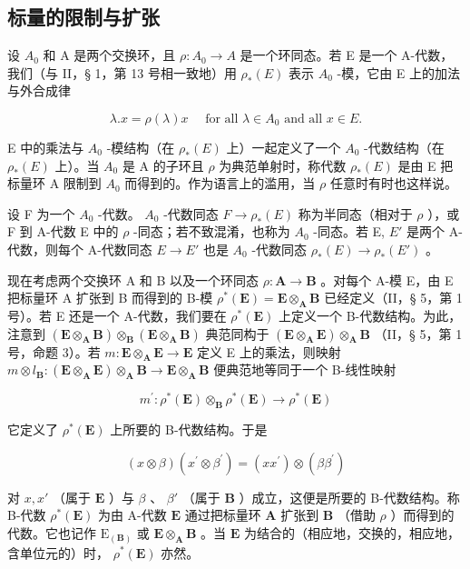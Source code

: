 \subsection{标量的限制与扩张}

设 \(A_{0}\) 和 A 是两个交换环，且 \(\rho:A_{0}\to A\) 是一个环同态。若 E 是一个 A-代数，我们（与 II，§ 1，第 13 号相一致地）用 \(\rho_{*}(E)\) 表示 \(A_{0}\) -模，它由 E 上的加法与外合成律

\[
\lambda . x = \rho (\lambda) x \quad \text { for   all } \lambda \in A _ {0} \text { and   all } x \in E.
\]

E 中的乘法与 \(A_{0}\) -模结构（在 \(\rho_{*}(E)\) 上）一起定义了一个 \(A_{0}\) -代数结构（在 \(\rho_{*}(E)\) 上）。当 \(A_{0}\) 是 A 的子环且 \(\rho\) 为典范单射时，称代数 \(\rho_{*}(E)\) 是由 E 把标量环 A 限制到 \(A_{0}\) 而得到的。作为语言上的滥用，当 \(\rho\) 任意时有时也这样说。

设 F 为一个 \(A_{0}\) -代数。 \(A_{0}\) -代数同态 \(F \to \rho_{*}(E)\) 称为半同态（相对于 \(\rho\) ），或 F 到 A-代数 E 中的 \(\rho\) -同态；若不致混淆，也称为 \(A_{0}\) -同态。若 E, \(E'\) 是两个 A-代数，则每个 A-代数同态 \(E \to E'\) 也是 \(A_{0}\) -代数同态 \(\rho_{*}(E) \to \rho_{*}(E')\) 。

现在考虑两个交换环 A 和 B 以及一个环同态 \(\rho: \mathbf{A} \to \mathbf{B}\) 。对每个 A-模 E，由 E 把标量环 A 扩张到 B 而得到的 B-模 \(\rho^{*}(\mathbf{E}) = \mathbf{E} \otimes_{\mathbf{A}} \mathbf{B}\) 已经定义（II，§ 5，第 1 号）。若 E 还是一个 A-代数，我们要在 \(\rho^{*}(\mathbf{E})\) 上定义一个 B-代数结构。为此，注意到 \((\mathbf{E} \otimes_{\mathbf{A}} \mathbf{B}) \otimes_{\mathbf{B}} (\mathbf{E} \otimes_{\mathbf{A}} \mathbf{B})\) 典范同构于 \((\mathbf{E} \otimes_{\mathbf{A}} \mathbf{E}) \otimes_{\mathbf{A}} \mathbf{B}\) （II，§ 5，第 1 号，命题 3）。若 \(m: \mathbf{E} \otimes_{\mathbf{A}} \mathbf{E} \to \mathbf{E}\) 定义 E 上的乘法，则映射 \(m \otimes l_{\mathbf{B}}: (\mathbf{E} \otimes_{\mathbf{A}} \mathbf{E}) \otimes_{\mathbf{A}} \mathbf{B} \to \mathbf{E} \otimes_{\mathbf{A}} \mathbf{B}\) 便典范地等同于一个 B-线性映射

\[
m ^ {\prime}: \rho^ {*} (\mathbf {E}) \otimes_ {\mathbf {B}} \rho^ {*} (\mathbf {E}) \rightarrow \rho^ {*} (\mathbf {E})
\]

它定义了 \(\rho^{*}(\mathbf{E})\) 上所要的 B-代数结构。于是

\[
(x \otimes \beta) (x ^ {\prime} \otimes \beta^ {\prime}) = (x x ^ {\prime}) \otimes (\beta \beta^ {\prime})\tag{5}
\]

对 \(x, x'\) （属于 \(\mathbf{E}\) ）与 \(\beta\) 、 \(\beta'\) （属于 \(\mathbf{B}\) ）成立，这便是所要的 B-代数结构。称 B-代数 \(\rho^*(\mathbf{E})\) 为由 A-代数 \(\mathbf{E}\) 通过把标量环 \(\mathbf{A}\) 扩张到 \(\mathbf{B}\) （借助 \(\rho\) ）而得到的代数。它也记作 \(\mathrm{E}_{(\mathbf{B})}\) 或 \(\mathbf{E} \otimes_{\mathbf{A}} \mathbf{B}\) 。当 \(\mathbf{E}\) 为结合的（相应地，交换的，相应地，含单位元的）时， \(\rho^*(\mathbf{E})\) 亦然。


